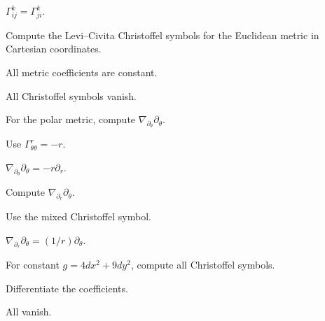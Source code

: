 \begin{solution}
\(\Gamma^k_{ij}=\Gamma^k_{ji}\).
\end{solution}

\begin{exercise}\label{exr:vii22-ped-02}
Compute the Levi--Civita Christoffel symbols for the Euclidean metric in Cartesian coordinates.
\end{exercise}

\begin{hint}
All metric coefficients are constant.
\end{hint}

\begin{solution}
All Christoffel symbols vanish.
\end{solution}

\begin{exercise}\label{exr:vii22-ped-03}
For the polar metric, compute \(\nabla_{\partial_\theta}\partial_\theta\).
\end{exercise}

\begin{hint}
Use \(\Gamma^r_{\theta\theta}=-r\).
\end{hint}

\begin{solution}
\(\nabla_{\partial_\theta}\partial_\theta=-r\partial_r\).
\end{solution}

\begin{exercise}\label{exr:vii22-ped-04}
Compute \(\nabla_{\partial_r}\partial_\theta\).
\end{exercise}

\begin{hint}
Use the mixed Christoffel symbol.
\end{hint}

\begin{solution}
\(\nabla_{\partial_r}\partial_\theta=(1/r)\partial_\theta\).
\end{solution}

\begin{exercise}\label{exr:vii22-ped-05}
For constant \(g=4dx^2+9dy^2\), compute all Christoffel symbols.
\end{exercise}

\begin{hint}
Differentiate the coefficients.
\end{hint}

\begin{solution}
All vanish.
\end{solution}

